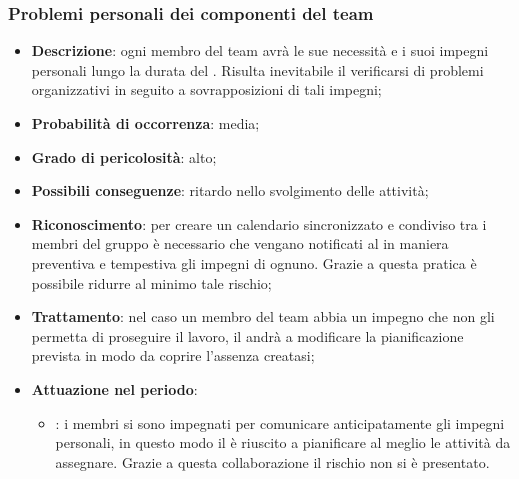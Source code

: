 \documentclass[PianoDiProgetto.tex]{subfiles}
\begin{document}
		\subsubsection{Problemi personali dei componenti del team}
			\label{sec:ppdct}
\begin{itemize}
		\item \textbf{Descrizione}: ogni membro del team avrà le sue necessità e i suoi impegni personali lungo la durata del . Risulta inevitabile il verificarsi di problemi organizzativi in seguito a sovrapposizioni di tali impegni;
		\item \textbf{Probabilità di occorrenza}: media;
		\item \textbf{Grado di pericolosità}: alto;
		\item \textbf{Possibili conseguenze}: ritardo nello svolgimento delle attività;
		\item \textbf{Riconoscimento}: per creare un calendario sincronizzato e condiviso tra i membri del gruppo è necessario che vengano notificati al \RESP{} in maniera preventiva e tempestiva gli impegni di ognuno. Grazie a questa pratica è possibile ridurre al minimo tale rischio;
		\item \textbf{Trattamento}: nel caso un membro del team abbia un impegno che non gli permetta di proseguire il lavoro, il \RESP{} andrà a modificare la pianificazione prevista in modo da coprire l'assenza creatasi;
		\item \textbf{Attuazione nel periodo}: 
			\begin{itemize}
				\item \PerAR : i membri si sono impegnati per comunicare anticipatamente gli impegni personali, in questo modo il \RESP{} è riuscito a pianificare al meglio le attività da assegnare. Grazie a questa collaborazione il rischio non si è presentato.
			\end{itemize}
	\end{itemize}
\end{document}
